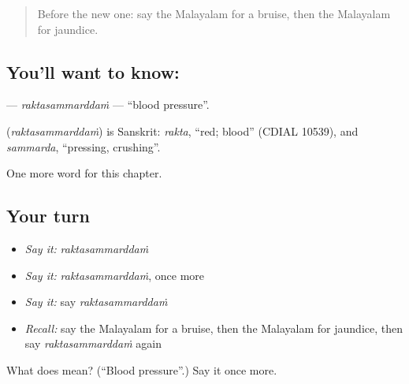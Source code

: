 \label{lesson:ML-C275-raktasammarddam}



\begin{quote}
Before the new one: say the Malayalam for a bruise, then the Malayalam for jaundice.
\end{quote}

\subsection*{You'll want to know: }
\textbf{} — \emph{raktasammarddaṁ} — \textquotedblleft{}blood pressure\textquotedblright{}.

\begin{cousinweb}
\textbf{} (\emph{raktasammarddaṁ}) is Sanskrit: \emph{rakta}, \textquotedblleft{}red; blood\textquotedblright{} (CDIAL 10539), and \emph{sammarda}, \textquotedblleft{}pressing, crushing\textquotedblright{}.
\end{cousinweb}

\begin{grammarlens}[title={What you've built}]
One more word for this chapter.
\end{grammarlens}

\subsection*{Your turn}
\begin{itemize}
\raggedright
  \item \emph{Say it:} \emph{raktasammarddaṁ}
  \item \emph{Say it:} \emph{raktasammarddaṁ}, once more
  \item \emph{Say it:} say \emph{raktasammarddaṁ}
  \item \emph{Recall:} say the Malayalam for a bruise, then the Malayalam for jaundice, then say \emph{raktasammarddaṁ} again
\end{itemize}

\begin{tcolorbox}[breakable,colback=teal!4,colframe=teal!35!black,title={Before you move on}]
What does  mean? (\textquotedblleft{}Blood pressure\textquotedblright{}.) Say it once more.
\end{tcolorbox}
